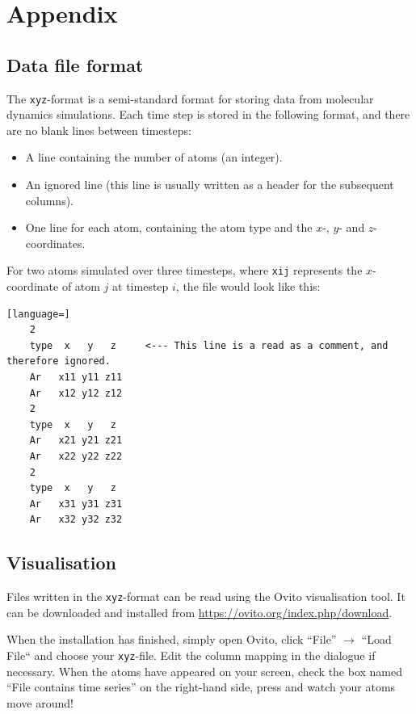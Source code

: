 \documentclass[11pt,english,a4paper]{report}
\renewcommand{\thesubsection}{\arabic{section}\alph{subsection})}
\begin{document}
\appendix
\section*{Appendix}
\setcounter{subsection}{0}
\renewcommand{\thesubsection}{\Alph{subsection}}

\subsection{Data file format}\label{app:xyz}
The \texttt{xyz}-format is a semi-standard format for storing data from molecular dynamics simulations. Each time step is stored in the following format, and there are no blank lines between timesteps:
\begin{itemize}
    \item A line containing the number of atoms (an integer).
    \item An ignored line (this line is usually written as a header for the subsequent columns).
    \item One line for each atom, containing the atom type and the \(x\)-, \(y\)- and \(z\)-coordinates.
\end{itemize}
For two atoms simulated over three timesteps, where \texttt{xij} represents the \(x\)-coordinate of atom \(j\) at timestep \(i\), the file would look like this:
\begin{lstlisting}[language=]
    2
    type  x   y   z     <--- This line is a read as a comment, and therefore ignored.
    Ar   x11 y11 z11
    Ar   x12 y12 z12
    2
    type  x   y   z
    Ar   x21 y21 z21
    Ar   x22 y22 z22
    2
    type  x   y   z
    Ar   x31 y31 z31
    Ar   x32 y32 z32
\end{lstlisting}



\subsection{Visualisation}\label{app:ovito}
Files written in the \texttt{xyz}-format can be read using the Ovito visualisation tool. It can be downloaded and installed from \url{https://ovito.org/index.php/download}.

When the installation has finished, simply open Ovito, click ``File'' \(\to\) ``Load File`` and choose your \texttt{xyz}-file. Edit the column mapping in the dialogue if necessary. When the atoms have appeared on your screen, check the box named ``File contains time series'' on the right-hand side, press  and watch your atoms move around!
\end{document}
